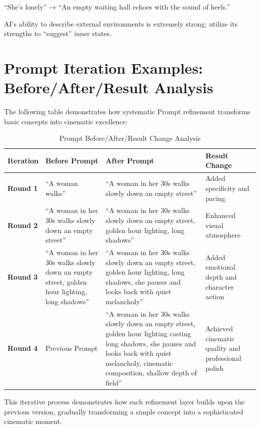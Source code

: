 \begin{Prompt}
``She's lonely'' → ``An empty waiting hall echoes with the sound of heels.''
\end{Prompt}

AI's ability to describe external environments is extremely strong; utilize its strengths to ``suggest'' inner states.

\section{Prompt Iteration Examples: Before/After/Result Analysis}
\label{sec:Prompt-iteration-examples}

The following table demonstrates how systematic Prompt refinement transforms basic concepts into cinematic excellence:

\begin{table}[H]
\centering
\caption{Prompt Before/After/Result Change Analysis \\ \authorillustration}
\label{tab:Prompt-iteration}
\begin{tabular}{|p{3cm}|p{4cm}|p{4cm}|p{3cm}|}
\hline
\textbf{Iteration} & \textbf{Before Prompt} & \textbf{After Prompt} & \textbf{Result Change} \\
\hline
\textbf{Round 1} & ``A woman walks'' & ``A woman in her 30s walks slowly down an empty street'' & Added specificity and pacing \\
\hline
\textbf{Round 2} & ``A woman in her 30s walks slowly down an empty street'' & ``A woman in her 30s walks slowly down an empty street, golden hour lighting, long shadows'' & Enhanced visual atmosphere \\
\hline
\textbf{Round 3} & ``A woman in her 30s walks slowly down an empty street, golden hour lighting, long shadows'' & ``A woman in her 30s walks slowly down an empty street, golden hour lighting, long shadows, she pauses and looks back with quiet melancholy'' & Added emotional depth and character action \\
\hline
\textbf{Round 4} & Previous Prompt & ``A woman in her 30s walks slowly down an empty street, golden hour lighting casting long shadows, she pauses and looks back with quiet melancholy, cinematic composition, shallow depth of field'' & Achieved cinematic quality and professional polish \\
\hline
\end{tabular}
\end{table}

This iterative process demonstrates how each refinement layer builds upon the previous version, gradually transforming a simple concept into a sophisticated cinematic moment.

